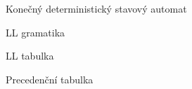\documentclass[12pt, a4paper]{article}
\begin{document}
\begin{figure}[H]
    \centering
    \caption{Konečný deterministický stavový automat} \label{obrazek_1}
\end{figure}

\begin{figure}[H]
    \centering
    \caption{LL gramatika} \label{obrazek_2}
\end{figure}

\begin{figure}[H]
    \centering
    \caption{LL tabulka} \label{obrazek_3}
\end{figure}

\begin{figure}[H]
    \centering
    \caption{Precedenční tabulka} \label{obrazek_4}
\end{figure}
\end{document}
